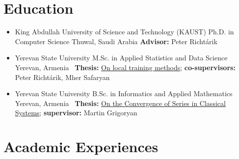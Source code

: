 \documentclass[11pt,a4paper,sans]{moderncv}        %
\newcommand{\peter}{Peter Richtárik}
\newcommand{\mher}{Mher Safaryan}
\newcommand{\grigoryan}{Martin Grigoryan}
\begin{document}
\makecvtitle 



\section{Education}

\begin{itemize}

\item{
  {King Abdullah University of Science and Technology (KAUST)}
  {Ph.D. in Computer Science}
  {Thuwal, Saudi Arabia}{}
  {\textbf{Advisor:} \peter}
} 

\vspace{1mm}

\item{
  {Yerevan State University}
  {M.Sc. in Applied Statistics and Data Science}
  {Yerevan, Armenia}{}
  {\faFile \ \textbf{Thesis:} \href{https://artomaranjyan.github.io/assets/pdf/Master_thesis.pdf}{On local training methods}; \textbf{co-supervisors:} \peter, \mher }
}

\vspace{1mm}

\item{
  {Yerevan State University}
  {B.Sc. in Informatics and Applied Mathematics}
  {Yerevan, Armenia}{}
  {\faFile \ \textbf{Thesis:} \href{https://artomaranjyan.github.io/assets/pdf/Bachelor_thesis.pdf}{On the Convergence of Series in Classical Systems}; \textbf{supervisor:} \grigoryan\\ }
}

\end{itemize}


\section{Academic Experiences}
\end{document}
